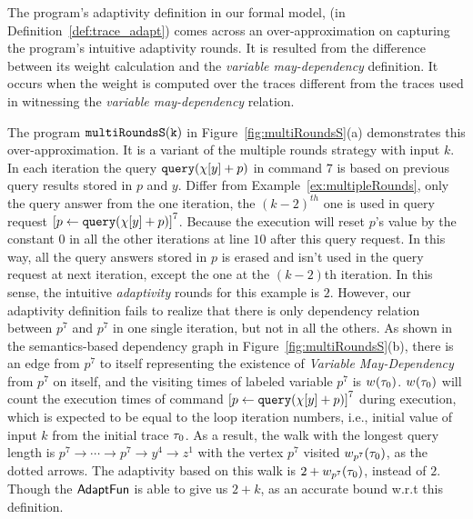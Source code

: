 \begin{example}
    \label{ex:multiRoundsS}
    The program's adaptivity definition in our formal model,
    (in Definition~\ref{def:trace_adapt})
     comes across an over-approximation on capturing the program's intuitive adaptivity rounds.
    It is resulted from the difference between its weight calculation and the \emph{variable may-dependency} definition.
    It occurs when the weight is computed over the traces different from the traces used in 
    witnessing the \emph{variable may-dependency} relation.
    
    The program $\mathtt{multiRoundsS(k)}$ in Figure~\ref{fig:multiRoundsS}(a) demonstrates this over-approximation.
    It is a variant of the multiple rounds strategy with input $k$.
    In each iteration the query ${\tt query}(\chi[y] + p)$ in command $7$ is based on previous query results stored in $p$ and $y$.
    Differ from Example~\ref{ex:multipleRounds},
    only the query answer from the one iteration, the $(k - 2)^{th}$ one is used in query request
    $\clabel{\assign{p}{\query(\chi[y]+p)} }^{7}$.
    Because the execution will reset
    $p$'s value by the constant $0$ in all the other iterations
    at line $10$ after this query request.
    In this way, all the query answers stored in $p$ is erased and isn't used
    in the query request at next iteration, except the one at the $(k - 2)$th iteration.
    In this sense, the intuitive \emph{adaptivity} rounds for this example is $2$. 
    However, our adaptivity definition fails to realize that there is only dependency relation 
    between $p^7$ and $p^7$ in one single iteration, 
    but not in all the others. 
    As shown in the semantics-based dependency graph in Figure~\ref{fig:multiRoundsS}(b), 
    there is an edge from $p^7$ to itself representing the existence of \emph{Variable May-Dependency} from $p^7$ on itself,
    and the visiting times of labeled variable $p^7$ is 
    $w_{}(\mathtt{\tau}_0)$. $w_{}(\mathtt{\tau}_0)$ will count the execution times of command $\clabel{\assign{p}{\query(\chi[y]+p)} }^{7}$ during execution, which is expected to be equal to the loop iteration numbers, i.e., initial value of input $k$ from the initial trace $\mathtt{\tau}_0$.
    As a result, the walk with the longest query length 
    is
    $p^7  \to \cdots \to p^7 \to y^4  \to z^1 $ with the vertex $p^7$ visited $w_{p^7}(\mathtt{\tau}_0)$, as the dotted arrows. 
    The adaptivity based on this walk
    is $2 + w_{p^7}(\mathtt{\tau}_0)$, instead of $2$. 
    Though the $\textsf{AdaptFun}$ is able to give us $2 + k$,  as an accurate bound w.r.t this definition.

\end{example}
